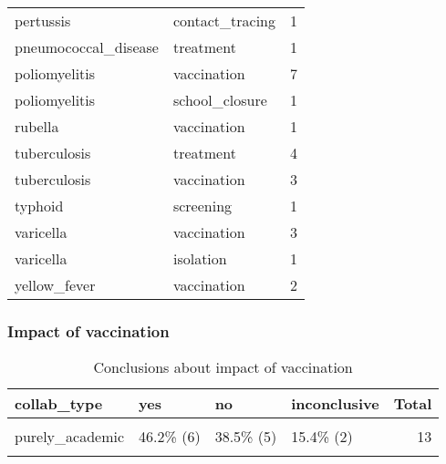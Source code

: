 \documentclass[
]{article}
\begin{document}
\begin{table}
\begin{tabular}{llr}
pertussis & contact\_tracing & 1\\
 
pneumococcal\_disease & treatment & 1\\
 
poliomyelitis & vaccination & 7\\
 
poliomyelitis & school\_closure & 1\\
 
rubella & vaccination & 1\\
 
tuberculosis & treatment & 4\\
 
tuberculosis & vaccination & 3\\
 
typhoid & screening & 1\\
 
varicella & vaccination & 3\\
 
varicella & isolation & 1\\
 
yellow\_fever & vaccination & 2\\
\bottomrule
\end{tabular}
\end{table}

\hypertarget{impact-of-vaccination}{%
\subsubsection{Impact of vaccination}\label{impact-of-vaccination}}

\begin{table}[H]

\caption{\label{tab:unnamed-chunk-23}Conclusions about impact of vaccination}
\centering
\begin{tabular}[t]{llllr}
\toprule
collab\_type & yes & no & inconclusive & Total\\
\midrule
\cellcolor{gray!6}{mixed} & \cellcolor{gray!6}{53.8\%  (7)} & \cellcolor{gray!6}{38.5\%  (5)} & \cellcolor{gray!6}{7.7\% (1)} & \cellcolor{gray!6}{13}\\
purely\_academic & 46.2\%  (6) & 38.5\%  (5) & 15.4\% (2) & 13\\
\cellcolor{gray!6}{Total} & \cellcolor{gray!6}{50.0\% (13)} & \cellcolor{gray!6}{38.5\% (10)} & \cellcolor{gray!6}{11.5\% (3)} & \cellcolor{gray!6}{26}\\
\bottomrule
\end{tabular}
\end{table}
\end{document}
